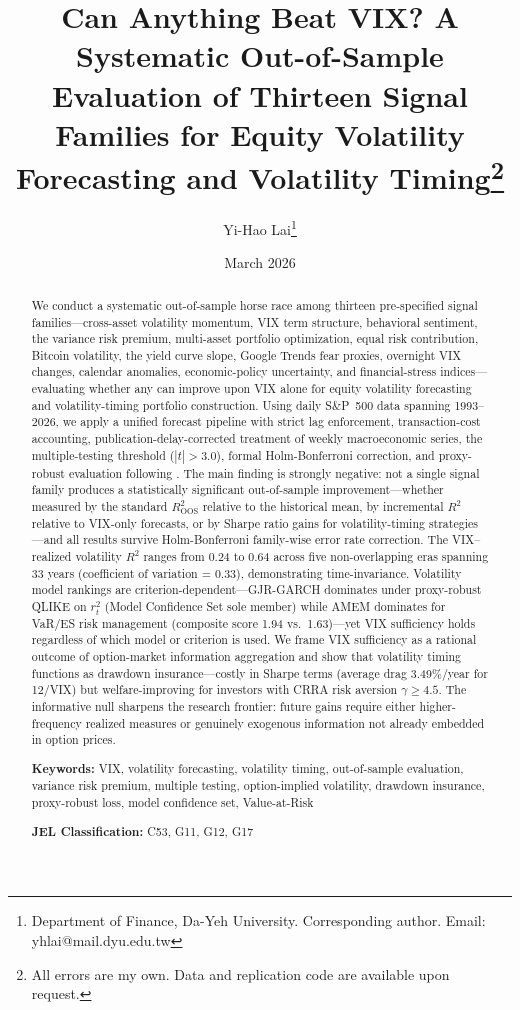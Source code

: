 \documentclass[12pt,a4paper]{article}
\title{Can Anything Beat VIX? A Systematic Out-of-Sample Evaluation of Thirteen Signal Families for Equity Volatility Forecasting and Volatility Timing\thanks{All errors are my own. Data and replication code are available upon request.}}
\author{Yi-Hao Lai\thanks{Department of Finance, Da-Yeh University. Corresponding author. Email: yhlai@mail.dyu.edu.tw}}
\date{March 2026}
\begin{document}
\maketitle

\begin{abstract}
\noindent
We conduct a systematic out-of-sample horse race among thirteen pre-specified signal families---cross-asset volatility momentum, VIX term structure, behavioral sentiment, the variance risk premium, multi-asset portfolio optimization, equal risk contribution, Bitcoin volatility, the yield curve slope, Google Trends fear proxies, overnight VIX changes, calendar anomalies, economic-policy uncertainty, and financial-stress indices---evaluating whether any can improve upon VIX alone for equity volatility forecasting and volatility-timing portfolio construction. Using daily S\&P~500 data spanning 1993--2026, we apply a unified forecast pipeline with strict lag enforcement, transaction-cost accounting, publication-delay-corrected treatment of weekly macroeconomic series, the \citet{harvey2016} multiple-testing threshold ($|t|>3.0$), formal Holm-Bonferroni correction, and proxy-robust evaluation following \citet{patton2011}. The main finding is strongly negative: not a single signal family produces a statistically significant out-of-sample improvement---whether measured by the standard \citet{campbell2008} $R^2_{\text{OOS}}$ relative to the historical mean, by incremental $R^2$ relative to VIX-only forecasts, or by Sharpe ratio gains for volatility-timing strategies---and all results survive Holm-Bonferroni family-wise error rate correction. The VIX--realized volatility $R^2$ ranges from 0.24 to 0.64 across five non-overlapping eras spanning 33 years (coefficient of variation = 0.33), demonstrating time-invariance. Volatility model rankings are criterion-dependent---GJR-GARCH dominates under proxy-robust QLIKE on $r_t^2$ (Model Confidence Set sole member) while AMEM dominates for VaR/ES risk management (composite score 1.94 vs.\ 1.63)---yet VIX sufficiency holds regardless of which model or criterion is used. We frame VIX sufficiency as a rational outcome of option-market information aggregation and show that volatility timing functions as drawdown insurance---costly in Sharpe terms (average drag 3.49\%/year for 12/VIX) but welfare-improving for investors with CRRA risk aversion $\gamma \geq 4.5$. The informative null sharpens the research frontier: future gains require either higher-frequency realized measures or genuinely exogenous information not already embedded in option prices.

\medskip
\noindent
\textbf{Keywords:} VIX, volatility forecasting, volatility timing, out-of-sample evaluation, variance risk premium, multiple testing, option-implied volatility, drawdown insurance, proxy-robust loss, model confidence set, Value-at-Risk

\medskip
\noindent
\textbf{JEL Classification:} C53, G11, G12, G17
\end{abstract}
\end{document}
